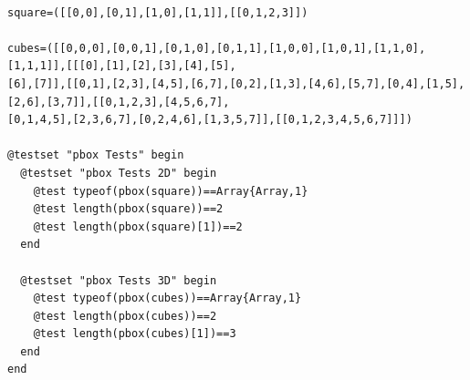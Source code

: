 \documentclass[a4paper,12pt]{article}
\begin{document}
\noindent{}
\begin{Verbatim}[fontsize=\footnotesize]

square=([[0,0],[0,1],[1,0],[1,1]],[[0,1,2,3]])

cubes=([[0,0,0],[0,0,1],[0,1,0],[0,1,1],[1,0,0],[1,0,1],[1,1,0],[1,1,1]],[[[0],[1],[2],[3],[4],[5],
[6],[7]],[[0,1],[2,3],[4,5],[6,7],[0,2],[1,3],[4,6],[5,7],[0,4],[1,5],[2,6],[3,7]],[[0,1,2,3],[4,5,6,7],
[0,1,4,5],[2,3,6,7],[0,2,4,6],[1,3,5,7]],[[0,1,2,3,4,5,6,7]]])

@testset "pbox Tests" begin
  @testset "pbox Tests 2D" begin
    @test typeof(pbox(square))==Array{Array,1}
    @test length(pbox(square))==2
    @test length(pbox(square)[1])==2
  end
  
  @testset "pbox Tests 3D" begin
    @test typeof(pbox(cubes))==Array{Array,1}
    @test length(pbox(cubes))==2
    @test length(pbox(cubes)[1])==3
  end
end
\end{Verbatim}
\end{document}
